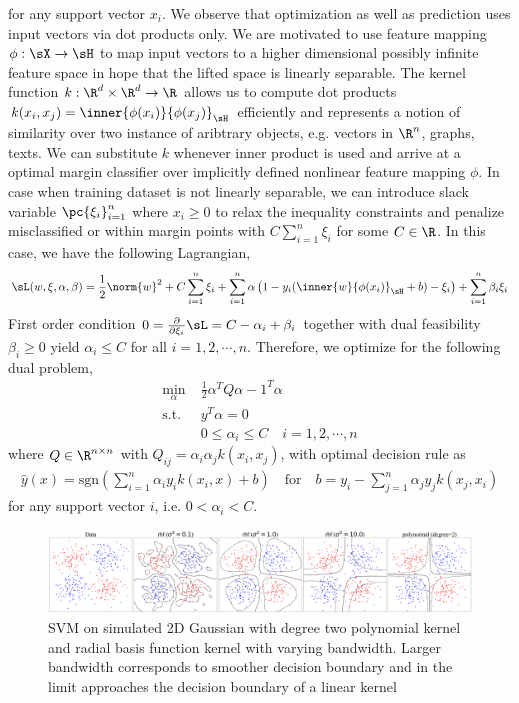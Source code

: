 \documentclass[11pt]{article}
\begin{document}
for any support vector $x_i$. We observe that optimization as well as prediction uses input vectors via dot products only. We are motivated to use feature mapping $\phi:\sX\to\sH$ to map input vectors to a higher dimensional possibly infinite feature space in hope that the lifted space is linearly separable. The kernel function $k: \R^d\times\R^d \to \R$ allows us to compute dot products $k(x_i,x_j)=\inner{\phi(x_i)}{\phi(x_j)}_{\sH}$ efficiently and represents a notion of similarity over two instance of aribtrary objects, e.g. vectors in $\R^n$, graphs, texts. We can substitute $k$ whenever inner product is used and arrive at a optimal margin classifier over implicitly defined nonlinear feature mapping $\phi$. In case when training dataset is not linearly separable, we can introduce slack variable $\pc{\xi_i}_{i=1}^n$ where $x_i\geq 0$ to relax the inequality constraints and penalize misclassified or within margin points with $C\sum_{i=1}^n \xi_i$ for some $C\in\R$. In this case, we have the following Lagrangian,
\begin{align}
    \sL(w,\xi,\alpha,\beta)
        = \frac{1}{2}\norm{w}^2 + C\sum_{i=1}^n \xi_i + \sum_{i=1}^n \alpha \left( 1-y_i ( \inner{w}{\phi(x_i)}_{\sH} + b )-\xi_i \right) + \sum_{i=1}^n \beta_i \xi_i
\end{align}
First order condition $0 = \frac{\partial}{\partial \xi_i}\sL = C - \alpha_i + \beta_i$ together with dual feasibility $\beta_i\geq 0$ yield $\alpha_i \leq C$ for all $i=1,2,\cdots,n$. Therefore, we optimize for the following dual problem,
\begin{align*}
    \min_{\alpha}
        \;& \frac{1}{2} \alpha^T Q \alpha - 1^T \alpha  \\
    \text{s.t.}
    \;& y^T\alpha = 0 \\
    \;& 0\leq \alpha_i \leq C \quad i=1,2,\cdots, n
\end{align*}
where $Q \in \R^{n\times n}$ with $Q_{ij} = \alpha_i \alpha_j k(x_i,x_j)$,
with optimal decision rule as
\begin{align}
    \hat{y}(x) = \text{sgn}\left(
        \sum_{i=1}^n \alpha_i y_i k(x_i,x) + b
    \right)
    \quad\text{for}\quad
    b = y_i - \sum_{j=1}^n \alpha_j y_j k(x_j,x_i)
\end{align}
for any support vector $i$, i.e. $0 < \alpha_i < C$.

\begin{center}
\begin{figure}[h!]
    \includegraphics[width=\textwidth]{assets/svm_on_2d_gaussian_vary_kernel.png} 
    \caption{SVM on simulated 2D Gaussian with degree two polynomial kernel and radial basis function kernel with varying bandwidth. Larger bandwidth corresponds to smoother decision boundary and in the limit approaches the decision boundary of a linear kernel}
\end{figure}
\end{center}
\end{document}
